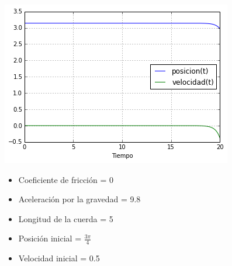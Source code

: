 \documentclass[12pt]{article}
\begin{document}
\includegraphics{5b.png}
\pagebreak
\begin{itemize}
\item Coeficiente de fricción = 0
\item Aceleración por la gravedad = 9.8
\item Longitud de la cuerda = 5
\item Posición inicial = $\frac{3\pi}{4}$
\item Velocidad inicial = 0.5
\end{itemize}
\end{document}

